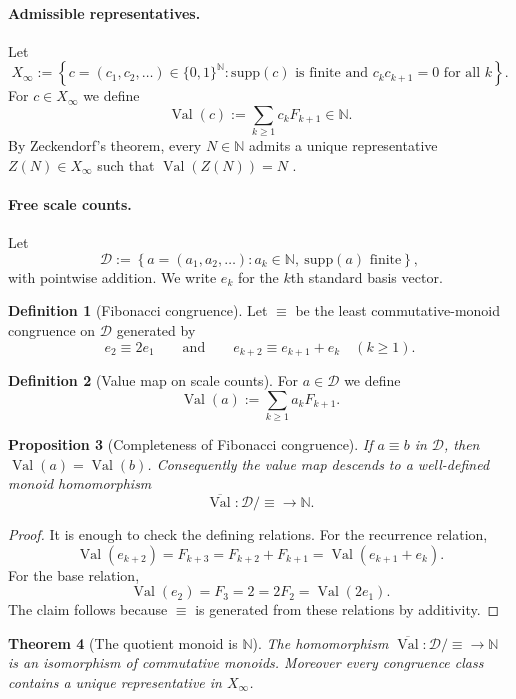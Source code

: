 \documentclass[11pt,letterpaper]{article}
\numberwithin{equation}{section}
\theoremstyle{plain}
\newtheorem{theorem}{Theorem}[section]
\newtheorem{proposition}[theorem]{Proposition}
\theoremstyle{definition}
\newtheorem{definition}[theorem]{Definition}
\theoremstyle{remark}
\newcommand{\D}{\mathcal{D}}
\newcommand{\NN}{\mathbb{N}}
\newcommand{\Xinf}{X_\infty}
\newcommand{\supp}{\mathrm{supp}}
\DeclareMathOperator{\Val}{Val}
\begin{document}
\paragraph{Admissible representatives.}
Let
\[
\Xinf
:=
\left\{
c=(c_1,c_2,\ldots)\in\{0,1\}^{\NN} :
\supp(c)\text{ is finite and } c_kc_{k+1}=0\text{ for all }k
\right\}.
\]
For $c\in \Xinf$ we define
\[
\Val(c):=\sum_{k\ge 1} c_k F_{k+1}\in \NN.
\]
By Zeckendorf's theorem, every $N\in\NN$ admits a unique representative
$Z(N)\in \Xinf$ such that $\Val(Z(N))=N$ \cite{Zeckendorf1972}.

\paragraph{Free scale counts.}
Let
\[
\D
:=
\left\{
a=(a_1,a_2,\ldots) : a_k\in\NN,\ \supp(a)\text{ finite}
\right\},
\]
with pointwise addition.  We write $e_k$ for the $k$th standard basis vector.

\begin{definition}[Fibonacci congruence]\label{def:fib-congruence}
Let $\equiv$ be the least commutative-monoid congruence on $\D$ generated by
\[
e_2\equiv 2e_1
\qquad\text{and}\qquad
e_{k+2}\equiv e_{k+1}+e_k \quad (k\ge 1).
\]
\end{definition}

\begin{definition}[Value map on scale counts]\label{def:val-on-D}
For $a\in\D$ we define
\[
\Val(a):=\sum_{k\ge 1} a_k F_{k+1}.
\]
\end{definition}

\begin{proposition}[Completeness of Fibonacci congruence]\label{prop:val-invariant}
If $a\equiv b$ in $\D$, then $\Val(a)=\Val(b)$.  Consequently the value map
descends to a well-defined monoid homomorphism
\[
\overline{\Val}:\D/\!\equiv \to \NN.
\]
\end{proposition}

\begin{proof}
It is enough to check the defining relations.  For the recurrence relation,
\[
\Val(e_{k+2})=F_{k+3}=F_{k+2}+F_{k+1}=\Val(e_{k+1}+e_k).
\]
For the base relation,
\[
\Val(e_2)=F_3=2=2F_2=\Val(2e_1).
\]
The claim follows because $\equiv$ is generated from these relations by
additivity.
\end{proof}

\begin{theorem}[The quotient monoid is $\NN$]\label{thm:monoid-quotient-is-N}
The homomorphism $\overline{\Val}:\D/\!\equiv \to \NN$ is an isomorphism of
commutative monoids.  Moreover every congruence class contains a unique
representative in $\Xinf$.
\end{theorem}
\end{document}
